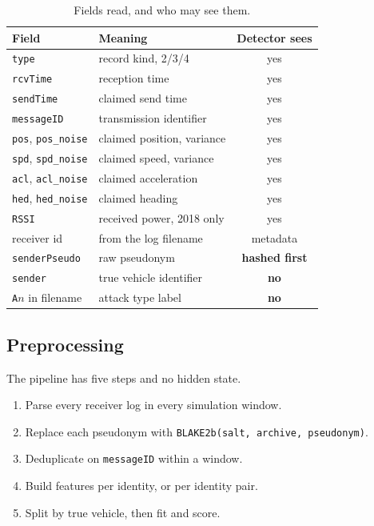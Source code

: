 \documentclass[conference]{IEEEtran}
\begin{document}
\begin{table}[t]
\caption{Fields read, and who may see them.}
\label{tab:schema}
\centering
\footnotesize
\begin{tabular}{llc}
\toprule
Field & Meaning & Detector sees \\
\midrule
\texttt{type} & record kind, 2/3/4 & yes \\
\texttt{rcvTime} & reception time & yes \\
\texttt{sendTime} & claimed send time & yes \\
\texttt{messageID} & transmission identifier & yes \\
\texttt{pos}, \texttt{pos\_noise} & claimed position, variance & yes \\
\texttt{spd}, \texttt{spd\_noise} & claimed speed, variance & yes \\
\texttt{acl}, \texttt{acl\_noise} & claimed acceleration & yes \\
\texttt{hed}, \texttt{hed\_noise} & claimed heading & yes \\
\texttt{RSSI} & received power, 2018 only & yes \\
receiver id & from the log filename & metadata \\
\midrule
\texttt{senderPseudo} & raw pseudonym & \textbf{hashed first} \\
\texttt{sender} & true vehicle identifier & \textbf{no} \\
\texttt{A}$n$ in filename & attack type label & \textbf{no} \\
\bottomrule
\end{tabular}
\end{table}

\subsection{Preprocessing}

The pipeline has five steps and no hidden state.

\begin{enumerate}
  \item Parse every receiver log in every simulation window.
  \item Replace each pseudonym with \texttt{BLAKE2b(salt, archive, pseudonym)}.
  \item Deduplicate on \texttt{messageID} within a window.
  \item Build features per identity, or per identity pair.
  \item Split by true vehicle, then fit and score.
\end{enumerate}
\end{document}
